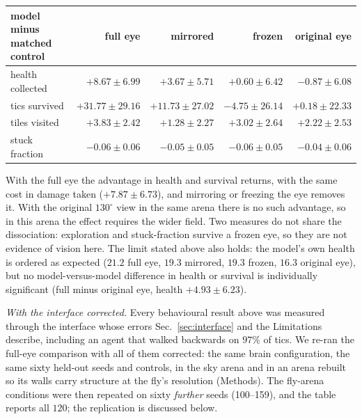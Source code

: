 \documentclass[10pt,twoside]{article}
\begin{document}
\begin{center}
\small
\begin{tabular}{lrrrr}
\toprule
model minus matched control & full eye & mirrored & frozen & original eye\\
\midrule
health collected & $\mathbf{+8.67\pm6.99}$ & $+3.67\pm5.71$ & $+0.60\pm6.42$ & $-0.87\pm6.08$\\
tics survived & $\mathbf{+31.77\pm29.16}$ & $+11.73\pm27.02$ & $-4.75\pm26.14$ & $+0.18\pm22.33$\\
tiles visited & $\mathbf{+3.83\pm2.42}$ & $+1.28\pm2.27$ & $\mathbf{+3.02\pm2.64}$ & $+2.22\pm2.53$\\
stuck fraction & $\mathbf{-0.06\pm0.06}$ & $\mathbf{-0.05\pm0.05}$ & $\mathbf{-0.06\pm0.05}$ & $-0.04\pm0.06$\\
\bottomrule
\end{tabular}
\end{center}

With the full eye the advantage in health and survival returns, with the same
cost in damage taken ($+7.87\pm6.73$), and mirroring or freezing the eye
removes it. With the original $130^\circ$ view in the same arena there is no
such advantage, so in this arena the effect requires the wider field. Two
measures do not share the dissociation: exploration and stuck-fraction
survive a frozen eye, so they are not evidence of vision here. The limit stated
above also holds: the model's own health is ordered as expected ($21.2$ full
eye, $19.3$ mirrored, $19.3$ frozen, $16.3$ original eye), but no
model-versus-model difference in health or survival is individually
significant (full minus original eye, health $+4.93\pm6.23$).

\emph{With the interface corrected.} Every behavioural result above was
measured through the interface whose errors Sec.~\ref{sec:interface} and the
Limitations describe, including an agent that walked backwards on $97\%$ of
tics. We re-ran the full-eye comparison with all of them corrected: the same
brain configuration, the same sixty held-out seeds and controls, in the sky
arena and in an arena rebuilt so its walls carry structure at the fly's
resolution (Methods). The fly-arena conditions were then repeated on sixty
\emph{further} seeds (100--159), and the table reports all $120$; the
replication is discussed below.
\end{document}
